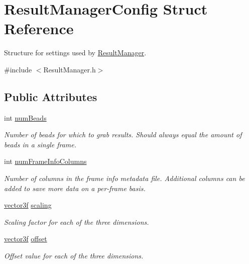 \hypertarget{struct_result_manager_config}{}\section{Result\+Manager\+Config Struct Reference}
\label{struct_result_manager_config}


Structure for settings used by \hyperlink{class_result_manager}{Result\+Manager}.  




{\ttfamily \#include $<$Result\+Manager.\+h$>$}

\subsection*{Public Attributes}
\begin{DoxyCompactItemize}
\item 
int \hyperlink{struct_result_manager_config_a790ecadd32a0c0242cb002752af806af}{num\+Beads}
\begin{DoxyCompactList}\small\item\em Number of beads for which to grab results. Should {\itshape always} equal the amount of beads in a single frame. \end{DoxyCompactList}\item 
int \hyperlink{struct_result_manager_config_a97e9e26724a91e3a6757957f18b8f8b7}{num\+Frame\+Info\+Columns}
\begin{DoxyCompactList}\small\item\em Number of columns in the frame info metadata file. Additional columns can be added to save more data on a per-\/frame basis. \end{DoxyCompactList}\item 
\hyperlink{std__incl_8h_a2feaef1d85a74bd5cf80df91b1a9a914}{vector3f} \hyperlink{struct_result_manager_config_abb553f047043e2bd16b27ba6221f358e}{scaling}
\begin{DoxyCompactList}\small\item\em Scaling factor for each of the three dimensions. \end{DoxyCompactList}\item 
\hyperlink{std__incl_8h_a2feaef1d85a74bd5cf80df91b1a9a914}{vector3f} \hyperlink{struct_result_manager_config_ac7b28e680c90bc2a882a6e064d919a40}{offset}
\begin{DoxyCompactList}\small\item\em Offset value for each of the three dimensions. \end{DoxyCompactList}\item 

\end{DoxyCompactItemize}
